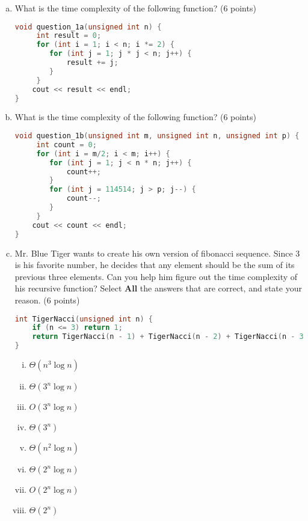 \documentclass[11pt]{exam}
\begin{document}
\begin{enumerate}[(a)] \label{prb:tiger_code}

\item What is the time complexity of the following function? (6 points)
\begin{lstlisting}[language=c++]
void question_1a(unsigned int n) {
	 int result = 0;
	 for (int i = 1; i < n; i *= 2) {
	 	for (int j = 1; j * j < n; j++) {
	 		result += j;
	 	}
	 }
	cout << result << endl;
}
\end{lstlisting}

\begin{solution}

\end{solution}

\item What is the time complexity of the following function? (6 points)
\begin{lstlisting}[language=c++]
void question_1b(unsigned int m, unsigned int n, unsigned int p) {
	 int count = 0;
	 for (int i = m/2; i < m; i++) {
	 	for (int j = 1; j < n * n; j++) {
	 		count++;
	 	}
		for (int j = 114514; j > p; j--) {
			count--;
		}	 
	 }
	cout << count << endl;
}
\end{lstlisting}

\begin{solution}

\end{solution}

\item Mr. Blue Tiger wants to create his own version of fibonacci sequence. Since 3 is his favorite number, he decides that any element should be the sum of its previous three elements. Can you help him figure out the time complexity of his recursive function? Select \textbf{All} the answers that are correct, and state your reason. (6 points)
\begin{lstlisting}[language=c++]
int TigerNacci(unsigned int n) {
	if (n <= 3) return 1;
	return TigerNacci(n - 1) + TigerNacci(n - 2) + TigerNacci(n - 3);
}
\end{lstlisting}
\begin{enumerate}[i)]
\item $\Theta(n^{3}\log n)$
\item $\Theta(3^{n}\log n)$
\item $O(3^{n}\log n)$
\item $\Theta(3^{n})$
\item $\Theta(n^{2}\log n)$
\item $\Theta(2^{n}\log n)$
\item $O(2^{n}\log n)$
\item $\Theta(2^{n})$
\end{enumerate}
\begin{solution}
\end{solution}


\end{enumerate}
\end{document}
